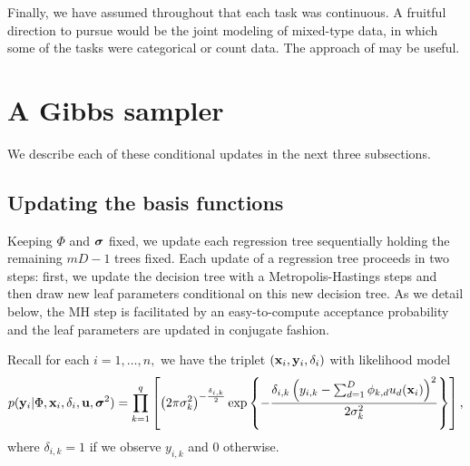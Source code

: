 \documentclass[12pt]{article}
\begin{document}
Finally, we have assumed throughout that each task was continuous.
A fruitful direction to pursue would be the joint modeling of mixed-type data, in which some of the tasks were categorical or count data.
The approach of \citet{Pourmohamad2016} may be useful.


\newpage


\newpage
\section{A Gibbs sampler}
\label{app:gibbs_sampler}

We describe each of these conditional updates in the next three subsections.

\subsection{Updating the basis functions}

Keeping $\Phi$ and $\boldsymbol{\sigma}$ fixed, we update each regression tree sequentially holding the remaining $mD - 1$ trees fixed.
Each update of a regression tree proceeds in two steps: first, we update the decision tree with a Metropolis-Hastings steps and then draw new leaf parameters conditional on this new decision tree.
As we detail below, the MH step is facilitated by an easy-to-compute acceptance probability and the leaf parameters are updated in conjugate fashion.

Recall for each $i = 1, \ldots, n,$ we have the triplet $(\mathbf{x}_{i}, \mathbf{y}_{i}, \delta_{i})$ with likelihood model
$$
p(\mathbf{y}_{i} | \Phi, \mathbf{x}_{i}, \delta_{i}, \mathbf{u}, \boldsymbol{\sigma}^{2}) = \prod_{k = 1}^{q}\left[\left(2\pi\sigma^{2}_{k}\right)^{-\frac{\delta_{i,k}}{2}}\exp\left\{-\frac{\delta_{i,k}\left(y_{i,k} - \sum_{d = 1}^{D}{\phi_{k,d}u_{d}(\mathbf{x}_{i})}\right)^{2}}{2\sigma^{2}_{k}}\right\}\right],
$$
where $\delta_{i,k} = 1$ if we observe $y_{i,k}$ and 0 otherwise.
\end{document}
